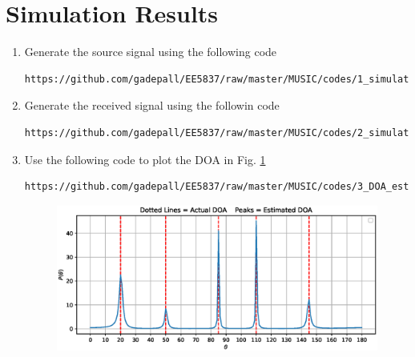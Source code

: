 \documentclass[journal,12pt,twocolumn]{IEEEtran}
\renewcommand\thesection{\arabic{section}}
\begin{document}
\section{Simulation Results}
\begin{enumerate}[label=\thesection.\arabic*
,ref=\thesection.\theenumi]
\item Generate the source signal using the following code
\begin{lstlisting}
https://github.com/gadepall/EE5837/raw/master/MUSIC/codes/1_simulate_source_signal.py
\end{lstlisting}
\item Generate the received signal using the followin code
\begin{lstlisting}
https://github.com/gadepall/EE5837/raw/master/MUSIC/codes/2_simulate_recieved_signal.py
\end{lstlisting}
\item Use the following code to plot the DOA in Fig. \ref{fig:music}
\begin{lstlisting}
https://github.com/gadepall/EE5837/raw/master/MUSIC/codes/3_DOA_estimation_MUSIC.py
\end{lstlisting}

\begin{figure}[!ht]
\centering
\includegraphics[width=\columnwidth]{./figs/music.eps}
\caption{}
\label{fig:music}
\end{figure}
\end{enumerate}
\end{document}
